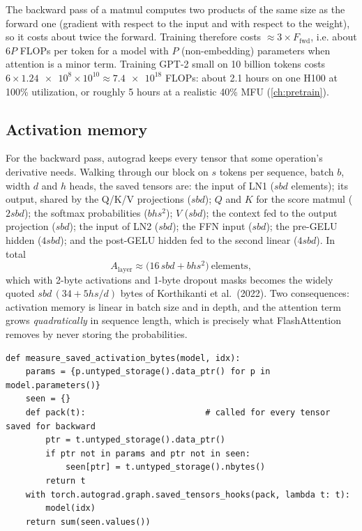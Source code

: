 \begin{keyidea}
The backward pass of a matmul computes two products of the same size as the forward one (gradient
with respect to the input and with respect to the weight), so it costs about twice the forward.
Training therefore costs $\approx 3\times F_\text{fwd}$, i.e. about $6P$ FLOPs per token for a
model with $P$ (non-embedding) parameters when attention is a minor term. Training GPT-2 small on
10 billion tokens costs $6\times\num{1.24e8}\times10^{10}\approx\num{7.4e18}$ FLOPs: about
2.1 hours on one H100 at 100\% utilization, or roughly 5 hours at a realistic 40\% MFU
(\cref{ch:pretrain}).
\end{keyidea}

\subsection{Activation memory}
For the backward pass, autograd keeps every tensor that some operation's derivative needs.
Walking through our block on $s$ tokens per sequence, batch $b$, width $d$ and $h$ heads, the
saved tensors are: the input of LN1 ($sbd$ elements); its output, shared by the Q/K/V projections
($sbd$); $Q$ and $K$ for the score matmul ($2sbd$); the softmax probabilities ($bhs^2$); $V$
($sbd$); the context fed to the output projection ($sbd$); the input of LN2 ($sbd$); the FFN input
($sbd$); the pre-GELU hidden ($4sbd$); and the post-GELU hidden fed to the second linear ($4sbd$).
In total
\begin{equation}
A_\text{layer} \approx \big(16\,sbd + b h s^2\big)\ \text{elements},
\label{eq:gpt:act}
\end{equation}
which with 2-byte activations and 1-byte dropout masks becomes the widely quoted
$sbd\,(34+5hs/d)$ bytes of Korthikanti et al.~(2022). Two consequences: activation memory is
linear in batch size and in depth, and the attention term grows \emph{quadratically} in sequence
length, which is precisely what FlashAttention removes by never storing the probabilities.

\begin{lstlisting}[caption={Measuring saved activations with autograd hooks.},label={lst:gpt:savedhooks}]
def measure_saved_activation_bytes(model, idx):
    params = {p.untyped_storage().data_ptr() for p in model.parameters()}
    seen = {}
    def pack(t):                        # called for every tensor saved for backward
        ptr = t.untyped_storage().data_ptr()
        if ptr not in params and ptr not in seen:
            seen[ptr] = t.untyped_storage().nbytes()
        return t
    with torch.autograd.graph.saved_tensors_hooks(pack, lambda t: t):
        model(idx)
    return sum(seen.values())
\end{lstlisting}

